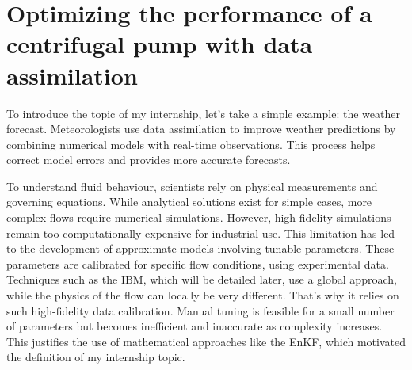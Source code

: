 \chapter{Optimizing the performance of a centrifugal pump with data assimilation}



To introduce the topic of my internship, let's take a simple example: the weather forecast. Meteorologists use data assimilation to improve weather predictions by combining numerical models with real-time observations. This process helps correct model errors and provides more accurate forecasts.

To understand fluid behaviour, scientists rely on physical measurements and governing equations. While analytical solutions exist for simple cases, more complex flows require numerical simulations. However, high-fidelity simulations remain too computationally expensive for industrial use.
This limitation has led to the development of approximate models involving tunable parameters. These parameters are calibrated for specific flow conditions, using experimental data. Techniques such as the \ac{IBM}, which will be detailed later, use a global approach, while the physics of the flow can locally be very different. That's why it relies on such high-fidelity data calibration.
Manual tuning is feasible for a small number of parameters but becomes inefficient and inaccurate as complexity increases. This justifies the use of mathematical approaches like the EnKF, which motivated the definition of my internship topic.

